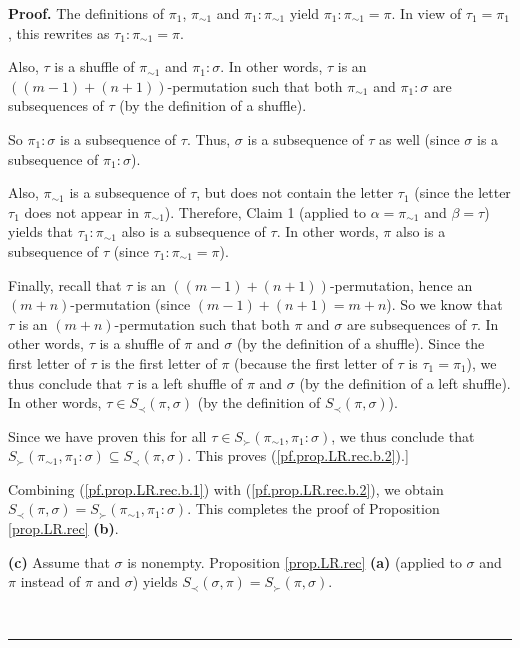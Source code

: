 \documentclass[numbers=enddot,12pt,final,onecolumn,notitlepage]{scrartcl}%
\theoremstyle{definition}
\newenvironment{proof}[1][Proof]{\noindent\textbf{#1.} }{\ \rule{0.5em}{0.5em}}
\newenvironment{verlong}{}{}
\begin{document}
\begin{verlong}
\begin{proof}
The definitions of $\pi_{1}$, $\pi_{\sim1}$ and $\pi_{1}:\pi_{\sim1}$ yield
$\pi_{1}:\pi_{\sim1}=\pi$. In view of $\tau_{1}=\pi_{1}$, this rewrites as
$\tau_{1}:\pi_{\sim1}=\pi$.

Also, $\tau$ is a shuffle of $\pi_{\sim1}$ and $\pi_{1}:\sigma$. In other
words, $\tau$ is an $\left(  \left(  m-1\right)  +\left(  n+1\right)  \right)
$-permutation such that both $\pi_{\sim1}$ and $\pi_{1}:\sigma$ are
subsequences of $\tau$ (by the definition of a shuffle).

So $\pi_{1}:\sigma$ is a subsequence of $\tau$. Thus, $\sigma$ is
a subsequence of $\tau$ as well (since $\sigma$ is a subsequence of
$\pi_{1}:\sigma$).

Also, $\pi_{\sim1}$ is a subsequence of $\tau$, but does not contain
the letter $\tau_{1}$ (since the letter $\tau_{1}$ does not appear in
$\pi_{\sim1}$). Therefore, Claim 1 (applied to $\alpha=\pi_{\sim1}$ and
$\beta=\tau$) yields that $\tau_{1}:\pi_{\sim1}$ also is a subsequence
of $\tau$. In other words, $\pi$ also is a subsequence of $\tau$
(since $\tau_{1}:\pi_{\sim1}=\pi$).

Finally, recall that $\tau$ is an $\left(  \left(  m-1\right)  +\left(
n+1\right)  \right)  $-permutation, hence an $\left(  m+n\right)
$-permutation (since $\left(  m-1\right)  +\left(  n+1\right)  =m+n$). So we
know that $\tau$ is an $\left(  m+n\right)  $-permutation such that both $\pi$
and $\sigma$ are subsequences of $\tau$. In other words, $\tau$ is a
shuffle of $\pi$ and $\sigma$ (by the definition of a shuffle). Since the
first letter of $\tau$ is the first letter of $\pi$ (because the first letter
of $\tau$ is $\tau_{1}=\pi_{1}$), we thus conclude that $\tau$ is a left
shuffle of $\pi$ and $\sigma$ (by the definition of a left shuffle). In other
words, $\tau\in S_{\prec}\left(  \pi,\sigma\right)  $ (by the definition of
$S_{\prec}\left(  \pi,\sigma\right)  $).

Since we have proven this for all $\tau\in S_{\succ}\left(  \pi_{\sim1}%
,\pi_{1}:\sigma\right)  $, we thus conclude that $S_{\succ}\left(  \pi_{\sim
1},\pi_{1}:\sigma\right)  \subseteq S_{\prec}\left(  \pi,\sigma\right)  $.
This proves (\ref{pf.prop.LR.rec.b.2}).]

Combining (\ref{pf.prop.LR.rec.b.1}) with (\ref{pf.prop.LR.rec.b.2}), we
obtain $S_{\prec}\left(  \pi,\sigma\right)  =S_{\succ}\left(  \pi_{\sim1}%
,\pi_{1}:\sigma\right)  $. This completes the proof of Proposition
\ref{prop.LR.rec} \textbf{(b)}.

\textbf{(c)} Assume that $\sigma$ is nonempty. Proposition \ref{prop.LR.rec}
\textbf{(a)} (applied to $\sigma$ and $\pi$ instead of $\pi$ and $\sigma$)
yields $S_{\prec}\left(  \sigma,\pi\right)  =S_{\succ}\left(  \pi
,\sigma\right)  $.


\end{proof}
\end{verlong}
\end{document}

